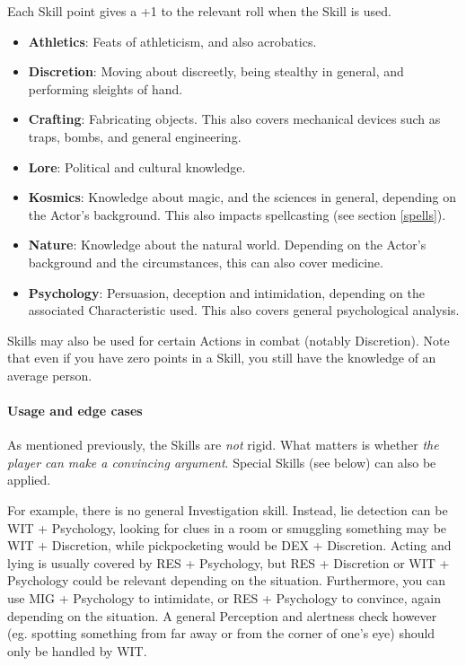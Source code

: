 Each Skill point gives a +1 to the relevant roll when the Skill is used.

\begin{itemize}
    \item \textbf{Athletics}: Feats of athleticism, and also acrobatics.
    \item \textbf{Discretion}: Moving about discreetly, being stealthy in general, and performing sleights of hand.
    \item \textbf{Crafting}: Fabricating objects. This also covers mechanical devices such as traps, bombs, and general engineering.
    \item \textbf{Lore}: Political and cultural knowledge.
    \item \textbf{Kosmics}: Knowledge about magic, and the sciences in general, depending on the Actor's background. This also impacts spellcasting (see section \ref{spells}).
    \item \textbf{Nature}: Knowledge about the natural world. Depending on the Actor's background and the circumstances, this can also cover medicine.
    \item \textbf{Psychology}: Persuasion, deception and intimidation, depending on the associated Characteristic used. This also covers general psychological analysis.
\end{itemize}

Skills may also be used for certain Actions in combat (notably Discretion). Note that even if you have zero points in a Skill, you still have the knowledge of an average person.


\paragraph{Usage and edge cases}

As mentioned previously, the Skills are \textit{not} rigid. What matters is whether \textit{the player can make a convincing argument}. Special Skills (see below) can also be applied.

For example, there is no general Investigation skill. Instead, lie detection can be WIT + Psychology, looking for clues in a room or smuggling something may be WIT + Discretion, while pickpocketing would be DEX + Discretion. Acting and lying is usually covered by RES + Psychology, but RES + Discretion or WIT + Psychology could be relevant depending on the situation. Furthermore, you can use MIG + Psychology to intimidate, or RES + Psychology to convince, again depending on the situation. A general Perception and alertness check however (eg. spotting something from far away or from the corner of one's eye) should only be handled by WIT.

